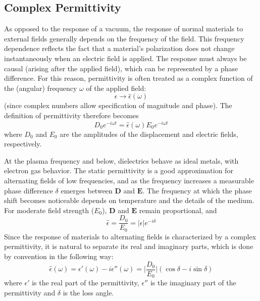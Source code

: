 \documentclass[%
 aip,
 amsmath,amssymb,
 reprint, floatfix%
]{revtex4-1}
\begin{document}
    \subsection{Complex Permittivity}
    As opposed to the response of a vacuum, the response of normal materials to external fields generally depends on the frequency of the field. This frequency dependence reflects the fact that a material's polarization does not change instantaneously when an electric field is applied. The response must always be causal (arising after the applied field), which can be represented by a phase difference. For this reason, permittivity is often treated as a complex function of the (angular) frequency $\omega$ of the applied field:
    \begin{equation}
        \epsilon \rightarrow \hat{\epsilon}(\omega)
    \end{equation}
    (since complex numbers allow specification of magnitude and phase). The definition of permittivity therefore becomes
    \begin{equation}
        D_0 e^{-i \omega t} = \hat{\epsilon}(\omega) E_0 e^{-i \omega t}
    \end{equation}
    where $D_0$ and $E_0$ are the amplitudes of the displacement and electric fields, respectively.
    \par
    At the plasma frequency and below, dielectrics behave as ideal metals, with electron gas behavior. The static permittivity is a good approximation for alternating fields of low frequencies, and as the frequency increases a measurable phase difference $\delta$ emerges between $\mathbf{D}$ and $\mathbf{E}$. The frequency at which the phase shift becomes noticeable depends on temperature and the details of the medium. For moderate field strength ($E_0$), $\mathbf{D}$ and $\mathbf{E}$ remain proportional, and
    \begin{equation}
        \hat{\epsilon} = \dfrac{D_0}{E_0} = \lvert \epsilon \rvert e^{-i \delta}
    \end{equation}
    Since the response of materials to alternating fields is characterized by a complex permittivity, it is natural to separate its real and imaginary parts, which is done by convention in the following way:
    \begin{equation}
        \hat{\epsilon}(\omega) = \epsilon'(\omega) - i \epsilon''(\omega) = \Bigg \lvert \dfrac{D_0}{E_0} \Bigg \rvert (\cos \delta - i \sin \delta)
    \end{equation}
    where $\epsilon'$ is the real part of the permittivity, $\epsilon''$ is the imaginary part of the permittivity and $\delta$ is the loss angle.
\end{document}
